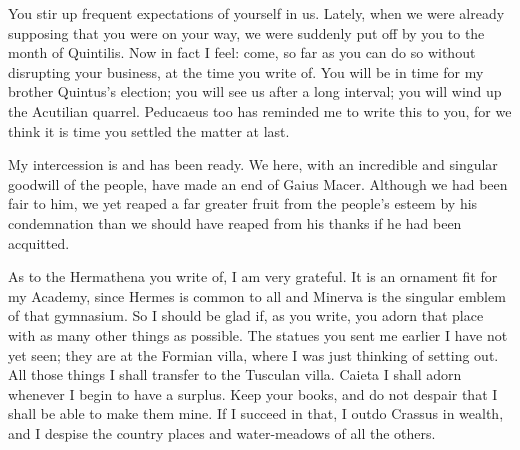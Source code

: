 

 You stir up frequent expectations of yourself in us. Lately, when we were already supposing that you were on your way, we were suddenly put off by you to the month of Quintilis. Now in fact I feel: come, so far as you can do so without disrupting your business, at the time you write of. You will be in time for my brother Quintus's election; you will see us after a long interval; you will wind up the Acutilian quarrel. Peducaeus too has reminded me to write this to you, for we think it is time you settled the matter at last.

 My intercession is and has been ready. We here, with an incredible and singular goodwill of the people, have made an end of Gaius Macer. Although we had been fair to him, we yet reaped a far greater fruit from the people's esteem by his condemnation than we should have reaped from his thanks if he had been acquitted.

 As to the Hermathena you write of, I am very grateful. It is an ornament fit for my Academy, since Hermes is common to all and Minerva is the singular emblem of that gymnasium. So I should be glad if, as you write, you adorn that place with as many other things as possible. The statues you sent me earlier I have not yet seen; they are at the Formian villa, where I was just thinking of setting out. All those things I shall transfer to the Tusculan villa. Caieta I shall adorn whenever I begin to have a surplus. Keep your books, and do not despair that I shall be able to make them mine. If I succeed in that, I outdo Crassus in wealth, and I despise the country places and water-meadows of all the others.
